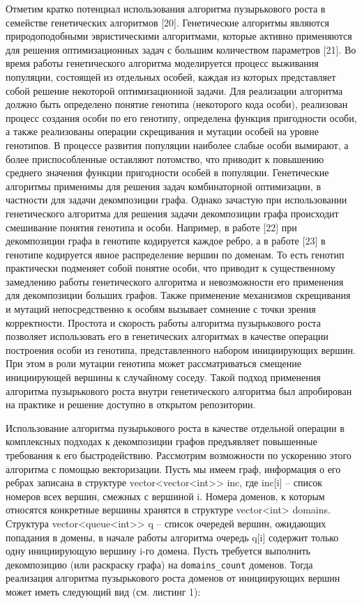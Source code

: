 \documentclass[
11pt,%
tightenlines,%
twoside,%
onecolumn,%
nofloats,%
nobibnotes,%
nofootinbib,%
superscriptaddress,%
noshowpacs,%
centertags]%
{revtex4}
\begin{document}
Отметим кратко потенциал использования алгоритма пузырькового роста в семействе генетических алгоритмов [20].
Генетические алгоритмы являются природоподобными эвристическими алгоритмами, которые активно применяются для решения оптимизационных задач с большим количеством параметров [21].
Во время работы генетического алгоритма моделируется процесс выживания популяции, состоящей из отдельных особей, каждая из которых представляет собой решение некоторой оптимизационной задачи.
Для реализации алгоритма должно быть определено понятие генотипа (некоторого кода особи), реализован процесс создания особи по его генотипу, определена функция пригодности особи, а также реализованы операции скрещивания и мутации особей на уровне генотипов.
В процессе развития популяции наиболее слабые особи вымирают, а более приспособленные оставляют потомство, что приводит к повышению среднего значения функции пригодности особей в популяции.
Генетические алгоритмы применимы для решения задач комбинаторной оптимизации, в частности для задачи декомпозиции графа.
Однако зачастую при использовании генетического алгоритма для решения задачи декомпозиции графа происходит смешивание понятия генотипа и особи.
Например, в работе [22] при декомпозиции графа в генотипе кодируется каждое ребро, а в работе [23] в генотипе кодируется явное распределение вершин по доменам.
То есть генотип практически подменяет собой понятие особи, что приводит к существенному замедлению работы генетического алгоритма и невозможности его применения для декомпозиции больших графов.
Также применение механизмов скрещивания и мутаций непосредственно к особям вызывает сомнение с точки зрения корректности.
Простота и скорость работы алгоритма пузырькового роста позволяет использовать его в генетических алгоритмах в качестве операции построения особи из генотипа, представленного набором инициирующих вершин.
При этом в роли мутации генотипа может рассматриваться смещение инициирующей вершины к случайному соседу.
Такой подход применения алгоритма пузырькового роста внутри генетического алгоритма был апробирован на практике и решение доступно в открытом репозитории.

Использование алгоритма пузырькового роста в качестве отдельной операции в комплексных подходах к декомпозиции графов предъявляет повышенные требования к его быстродействию.
Рассмотрим возможности по ускорению этого алгоритма с помощью векторизации.
Пусть мы имеем граф, информация о его ребрах записана в структуре vector<vector<int>> inc, где inc[i] -- список номеров всех вершин, смежных с вершиной i.
Номера доменов, к которым относятся конкретные вершины хранятся в структуре vector<int> domains.
Структура vector<queue<int>> q -- список очередей вершин, ожидающих попадания в домены, в начале работы алгоритма очередь q[i] содержит только одну инициирующую вершину i-го домена.
Пусть требуется выполнить декомпозицию (или раскраску графа) на \texttt{domains\_count} доменов.
Тогда реализация алгоритма пузырькового роста доменов от инициирующих вершин может иметь следующий вид (см. листинг 1):
\end{document}
